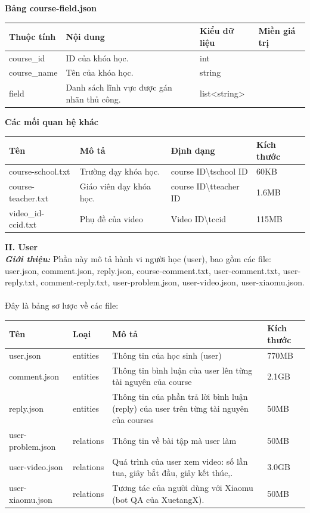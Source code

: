 \textbf{Bảng course-field.json}
\begin{center}
\begin{tabular}{|| m{6em}  m{10em}  m{6em}  m{11em}||} 
 \hline
 \textbf{Thuộc tính} & \textbf{Nội dung} & \textbf{Kiểu dữ liệu} & \textbf{Miền giá trị} \\ [0.5ex] 
 \hline\hline
 course\_id & ID của khóa học. & int & \\
 \hline
 course\_name & Tên của khóa học. & string &  \\ \hline
 field & Danh sách lĩnh vực được gán nhãn thủ công. & list<string> &  \\ [1ex] 
 \hline
\end{tabular}
\end{center}
\textbf{Các mối quan hệ khác}
\begin{center}
\begin{tabular}{|| m{5em}  m{10em}  m{11em}  m{5em}||} 
 \hline
 \textbf{Tên} & \textbf{Mô tả} & \textbf{Định dạng} & \textbf{Kích thước} \\ [0.5ex] 
 \hline\hline
course-school.txt & Trường dạy khóa học. & {course ID}\textbackslash t{school ID} &60KB \\
 \hline
 course-teacher.txt &Giáo viên dạy khóa học. & {course ID}\textbackslash t{teacher ID} & 1.6MB \\ \hline
 video\_id-ccid.txt & Phụ đề của video & {Video ID}\textbackslash t{ccid} &115MB  \\ [1ex] 
 \hline
\end{tabular}
\end{center}
\textbf{II. User}\\
\textbf{\textit{Giới thiệu:}} Phần này mô tả hành vi người học (user), bao gồm các file: user.json, comment.json, reply.json, course-comment.txt, user-comment.txt, user-reply.txt, comment-reply.txt, user-problem,json, user-video.json, user-xiaomu.json.\\
\\
Đây là bảng sơ lược về các file:
%
\begin{center}
\begin{tabular}{|| m{10em}  m{5em}  m{11em}  m{5em}||} 
 \hline
 \textbf{Tên} & \textbf{Loại} & \textbf{Mô tả} & \textbf{Kích thước} \\ [0.5ex] 
 \hline\hline
user.json &entities & Thông tin của học sinh (user) &770MB \\
 \hline
 comment.json &entities & Thông tin bình luận của user lên từng tài nguyên của course & 2.1GB \\ \hline
 reply.json & entities &Thông tin của phần trả lời bình luận (reply) của user trên từng tài nguyên của courses &50MB\\
 \hline
 user-problem.json &relations & Thông tin về bài tập mà user làm & 50MB \\ \hline
 user-video.json &relations & Quá trình của user xem video: số lần tua, giây bắt đầu, giây kết thúc,.& 3.0GB \\ \hline
 user-xiaomu.json & relations &  Tương tác của người dùng với Xiaomu (bot QA của XuetangX).  &50MB  \\ [1ex] 
 \hline
\end{tabular}
\end{center}
